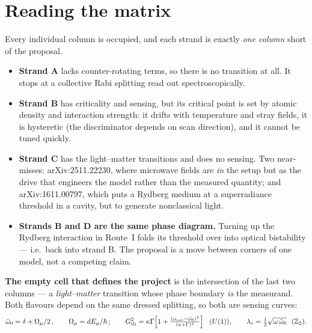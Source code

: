 \documentclass[10pt,a4paper,landscape]{article}
\begin{document}
\vspace{1mm}

\newpage

\section*{\color{Navy} Reading the matrix}

Every individual column is occupied, and each strand is exactly \emph{one column} short of the proposal.

\begin{itemize}[leftmargin=1.4em,itemsep=1pt]
  \item \textbf{Strand A} lacks counter-rotating terms, so there is no transition at all. It stops at a
        collective Rabi splitting read out spectroscopically.
  \item \textbf{Strand B} has criticality and sensing, but its critical point is set by atomic density and
        interaction strength: it drifts with temperature and stray fields, it is hysteretic (the discriminator
        depends on scan direction), and it cannot be tuned quickly.
  \item \textbf{Strand C} has the light--matter transitions and does no sensing. Two near-misses:
        arXiv:2511.22230, where microwave fields are \emph{in} the setup but as the drive that engineers the
        model rather than the measured quantity; and arXiv:1611.00797, which puts a Rydberg medium at a
        superradiance threshold in a cavity, but to generate nonclassical light.
  \item \textbf{Strands B and D are the same phase diagram.} Turning up the Rydberg interaction in Route~I
        folds its threshold over into optical bistability --- i.e.\ back into strand B. The proposal is a move
        between corners of one model, not a competing claim.
\end{itemize}

\begin{tcolorbox}[colback=Ours,colframe=Gold,boxrule=0.8pt,arc=2pt,left=8pt,right=8pt,top=6pt,bottom=6pt]
\textbf{The empty cell that defines the project} is the intersection of the last two columns ---
a \emph{light--matter} transition whose phase boundary \emph{is} the measurand. Both flavours
depend on the same dressed splitting, so both are sensing curves:
\[
  \tilde\omega_0=\delta+\Omega_\mu/2\,,\qquad \Omega_\mu=dE_\mu/\hbar\,;
  \qquad
  G^2_{\rm th}=\kappa\Gamma\!\left[1+\tfrac{(\omega_{\rm cav}-\tilde\omega_0)^2}{(\kappa+\Gamma)^2}\right]
  \ \ (U(1)),
  \qquad
  \lambda_c=\tfrac12\sqrt{\omega\,\tilde\omega_0}\ \ (\mathbb{Z}_2).
\]
\end{tcolorbox}
\end{document}
